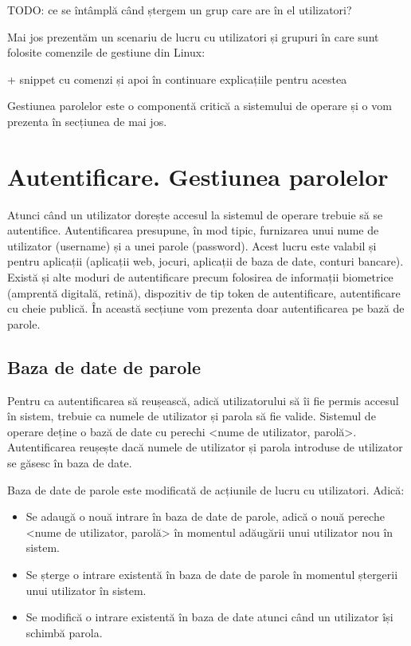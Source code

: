 TODO: ce se întâmplă când ștergem un grup care are în el utilizatori?

Mai jos prezentăm un scenariu de lucru cu utilizatori și grupuri în care sunt
folosite comenzile de gestiune din Linux:

+ snippet cu comenzi și apoi în continuare explicațiile pentru acestea

Gestiunea parolelor este o componentă critică a sistemului de operare și o vom
prezenta în secțiunea de mai jos.

\section{Autentificare. Gestiunea parolelor}
\label{sec:users-auth}

Atunci când un utilizator dorește accesul la sistemul de operare trebuie să se
autentifice. Autentificarea presupune, în mod tipic, furnizarea unui nume de
utilizator (username) și a unei parole (password). Acest lucru este valabil și
pentru aplicații (aplicații web, jocuri, aplicații de baza de date, conturi
bancare). Există și alte moduri de autentificare precum folosirea de informații
biometrice (amprentă digitală, retină), dispozitiv de tip token de
autentificare, autentificare cu cheie publică. În această secțiune vom prezenta
doar autentificarea pe bază de parole.

\subsection{Baza de date de parole}
\label{sec:users-auth-pass}

Pentru ca autentificarea să reușească, adică utilizatorului să îi fie permis
accesul în sistem, trebuie ca numele de utilizator și parola să fie valide.
Sistemul de operare deține o bază de date cu perechi <nume de utilizator,
parolă>. Autentificarea reușește dacă numele de utilizator și parola introduse
de utilizator se găsesc în baza de date.

Baza de date de parole este modificată de acțiunile de lucru cu utilizatori. Adică:

\begin{itemize}
	\item Se adaugă o nouă intrare în baza de date de parole, adică o nouă
		pereche <nume de utilizator, parolă> în momentul adăugării unui
		utilizator nou în sistem.
	\item Se șterge o intrare existentă în baza de date de parole în
		momentul ștergerii unui utilizator în sistem.
	\item Se modifică o intrare existentă în baza de date atunci când un
		utilizator își schimbă parola.
\end{itemize}

